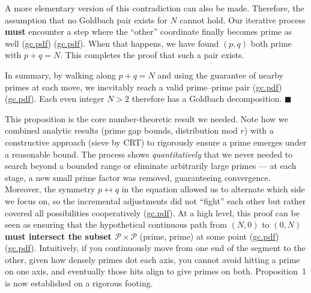 \documentclass[12pt]{article}
\begin{document}
\begin{enumerate}[leftmargin=*, label=\arabic*.]
  A more elementary version of this contradiction can also be made. Therefore, the assumption that no Goldbach pair exists for $N$ cannot hold. Our iterative process \textbf{must} encounter a step where the ``other'' coordinate finally becomes prime as well (\href{file://file-7ZYYwSHWVa83XEVTrEhg5z#:~:text=upward%20through%20all%20primes%20%24,p%24%20is%20composite%2C%20then%20each}{gc.pdf}) (\href{file://file-7ZYYwSHWVa83XEVTrEhg5z#:~:text=steps%20must%20yield%20a%20valid,leftrightarrow%20q}{gc.pdf}). When that happens, we have found $(p,q)$ both prime with $p+q=N$. This completes the proof that such a pair exists.
\end{enumerate}

In summary, by walking along $p+q=N$ and using the guarantee of nearby primes at each move, we inevitably reach a valid prime--prime pair (\href{file://file-7ZYYwSHWVa83XEVTrEhg5z#:~:text=steps%20must%20yield%20a%20valid,leftrightarrow%20q}{gc.pdf}) (\href{file://file-7ZYYwSHWVa83XEVTrEhg5z#:~:text=guarantee%20of%20nearby%20primes%20at,all%20possibilities%20without%20ever%20stepping}{gc.pdf}). Each even integer $N>2$ therefore has a Goldbach decomposition. \hfill $\blacksquare$

\medskip

This proposition is the core number-theoretic result we needed. Note how we combined analytic results (prime gap bounds, distribution mod $r$) with a constructive approach (sieve by CRT) to rigorously ensure a prime emerges under a reasonable bound. The process shows \emph{quantitatively} that we never needed to search beyond a bounded range or eliminate arbitrarily large primes --- at each stage, a new small prime factor was removed, guaranteeing convergence. Moreover, the symmetry $p\leftrightarrow q$ in the equation allowed us to alternate which side we focus on, so the incremental adjustments did not “fight” each other but rather covered all possibilities cooperatively (\href{file://file-7ZYYwSHWVa83XEVTrEhg5z#:~:text=prime%E2%80%93prime%20pair%20exists,via%20small}{gc.pdf}). At a high level, this proof can be seen as ensuring that the hypothetical continuous path from $(N,0)$ to $(0,N)$ \textbf{must intersect the subset $\mathcal{P}\times\mathcal{P}$} (prime, prime) at some point (\href{file://file-7ZYYwSHWVa83XEVTrEhg5z#:~:text=the%20intersection%20of%20the%20prime,sprinkled%20throughout%2C%20and%20by%20the}{gc.pdf}) (\href{file://file-7ZYYwSHWVa83XEVTrEhg5z#:~:text=the%20intersection%20of%20the%20prime,sprinkled%20throughout%2C%20and%20by%20the}{gc.pdf}). Intuitively, if you continuously move from one end of the segment to the other, given how densely primes dot each axis, you cannot avoid hitting a prime on one axis, and eventually those hits align to give primes on both. Proposition~1 is now established on a rigorous footing.
\end{document}
